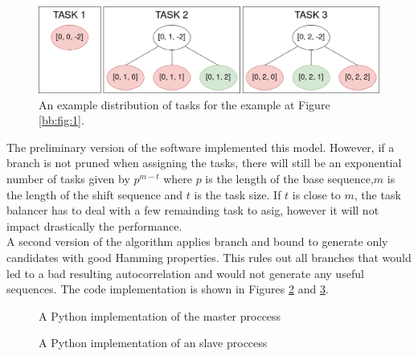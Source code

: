   \begin{figure}[ht!]
    \begin{center}
      \includegraphics[scale=0.4]{Chapters/Implementation/Example_tasks.png}
    \end{center}
    \caption{An example distribution of tasks for the example at Figure
    \ref{bb:fig:1}.}
    \label{tasks:fig:1}
  \end{figure}

  The preliminary version of the software implemented this model.  However, if a branch is not pruned when assigning the tasks, there will still be an exponential number of tasks
 given by $p^{m-t}$ where $p$ is the length of the base sequence,$m$ is the
  length of the shift sequence  and $t$ is the task size.  If $t$ is close to $m$, the task balancer has to deal with a few remainding  task to asig, however it will not impact drastically the performance.\\

  A second version of the algorithm applies branch and bound to generate only candidates with good Hamming properties.
  This rules out all branches that would led to a bad resulting autocorrelation and would not generate any useful sequences. The code
  implementation is shown in Figures \ref{parallelism_example:fig:1} and
  \ref{parallelism_example:fig:2}.\\

  \begin{figure}[ht!]
    \caption{A Python implementation of the master proccess}
    \label{parallelism_example:fig:1}
  \end{figure}

  \begin{figure}[ht!]
    \caption{A Python implementation of an slave proccess}
    \label{parallelism_example:fig:2}
  \end{figure}

 \\
